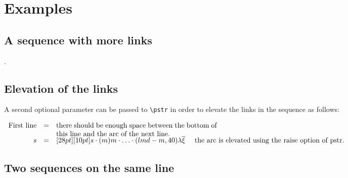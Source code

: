\section{Examples}

\subsection{A sequence with more links}
\begin{codeexample}[width=7cm]
.
\end{codeexample}


\subsection{Elevation of the links}
A second optional parameter can be passed to \verb|\pstr| in order to elevate the links in the sequence as follows:
\begin{codeexample}[width=5cm]
$\begin{array}{rclrcl}
\mbox{First line} &=& \parbox[t]{8cm}{there should be enough space between the
                        bottom of this line and the arc of the next line.} \\
                s &=& \Pstr[28pt][10pt]{ s \cdot (m){m} \cdot \ldots \cdot (lmd-m,40)
                         {\lambda\overline{\xi}} }
    \quad \mbox{ the arc is elevated using the raise option of pstr.}
\end{array}$
\end{codeexample}

\subsection{Two sequences on the same line}
\begin{codeexample}[width=7cm]
\qquad
{}
\end{codeexample}

